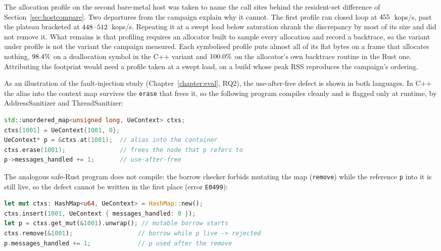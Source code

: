 \documentclass[english,oneside,a4paper,censored,csm,software-track-2020]{HYthesisML}
\begin{document}
\begin{appendices}
The allocation profile on the second bare-metal host was taken to name the call sites behind
the resident-set difference of Section~\ref{sec:hostcompare}. Two departures from the campaign
explain why it cannot. The first profile ran closed loop at $455$~kops/s, past the
plateau bracketed at $448$--$512$~kops/s. Repeating it at a swept load below saturation
shrank the discrepancy by most of its size and did not remove it. What remains is that
profiling requires an allocator built to sample every allocation and record a backtrace, so the
variant under profile is not the variant the campaign measured. Each symbolised profile puts almost all
of its flat bytes on a frame that allocates nothing, $98.4\%$ on a deallocation
symbol in the C++ variant and $100.0\%$ on the allocator's own backtrace routine in the
Rust one. Attributing the footprint would need a profile taken at a swept load, on a build
whose peak RSS reproduces the campaign's ordering.

As an illustration of the fault-injection study (Chapter~\ref{chapter:eval}, RQ2), the
use-after-free defect is shown in both languages. In C++ the alias into the context map
survives the \texttt{erase} that frees it, so the following program compiles cleanly and is
flagged only at runtime, by AddressSanitizer and ThreadSanitizer:

\begin{lstlisting}[language=C++]
std::unordered_map<unsigned long, UeContext> ctxs;
ctxs[1001] = UeContext{1001, 0};
UeContext* p = &ctxs.at(1001);  // alias into the container
ctxs.erase(1001);               // frees the node that p refers to
p->messages_handled += 1;       // use-after-free
\end{lstlisting}

The analogous safe-Rust program does not compile: the borrow checker forbids mutating the map
(\texttt{remove}) while the reference \texttt{p} into it is still live, so the defect cannot be
written in the first place (error \texttt{E0499}):

\begin{lstlisting}[language=Rust]
let mut ctxs: HashMap<u64, UeContext> = HashMap::new();
ctxs.insert(1001, UeContext { messages_handled: 0 });
let p = ctxs.get_mut(&1001).unwrap(); // mutable borrow starts
ctxs.remove(&1001);                  // borrow while p live -> rejected
p.messages_handled += 1;             // p used after the remove
\end{lstlisting}


\end{appendices}
\end{document}
